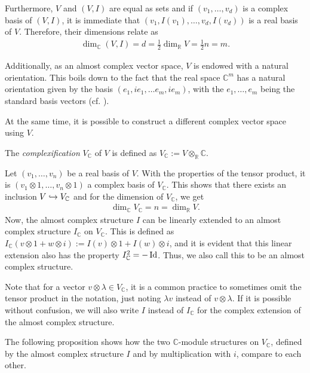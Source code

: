 Furthermore, $V$ and $(V,I)$ are equal as sets and if $(v_1,\dots,v_d)$ is a complex basis of
$(V,I)$, it is immediate that $(v_1,I(v_1),\dots,v_d,I(v_d))$ is a real basis of $V$. Therefore,
their dimensions relate as
\begin{align*}
	\dim_\mathbb{C} (V,I) = d = \frac{1}{2} \dim_\mathbb{R} V = \frac{1}{2}n = m.
\end{align*}

Additionally, as an almost complex vector space, $V$ is endowed with a natural orientation. This
boils down to the fact that the real space $\mathbb{C}^m$ has a natural orientation given by the
basis $(e_1, ie_1, \dots e_m, ie_m)$, with the $e_1,\dots,e_m$ being the standard basis vectors (cf.
\cite[Corollary 1.2.3]{Huybrechts2004}).

At the same time, it is possible to construct a different complex vector space using $V$. 
\begin{defn}
	The \emph{complexification} $V_\mathbb{C}$ of $V$ is defined as
	$V_\mathbb{C} := V \otimes_\mathbb{R} \mathbb{C}$.
\end{defn}
Let $\left(v_1, \dots, v_n\right)$ be a real basis of $V$. With the properties of the tensor
product, it is $\left(v_1 \otimes 1, \dots , v_n \otimes 1\right)$ a complex basis of
$V_\mathbb{C}$. This shows that there exists an inclusion $V \hookrightarrow V_\mathbb{C}$ and for the
dimension of $V_\mathbb{C}$, we get
\begin{align*}
	\dim_\mathbb{C} V_\mathbb{C} = n = \dim_\mathbb{R} V.
\end{align*}
Now, the almost complex structure $I$ can be linearly extended to an almost complex structure
$I_\mathbb{C}$ on $V_\mathbb{C}$. This is defined as $I_\mathbb{C} (v\otimes 1 + w \otimes i) :=
I(v) \otimes 1 + I(w)\otimes i$, and it is evident that this linear extension also has the property
$I_\mathbb{C}^2 = -\operatorname{Id}$. Thus, we also call this to be an almost complex structure.
\begin{nota}
	Note that for a vector $v\otimes \lambda \in V_\mathbb{C}$, it is a common practice to sometimes
	omit the tensor product in the notation, just noting $\lambda v$ instead of $v \otimes \lambda$. If
	it is possible without confusion, we will also write $I$ instead of $I_\mathbb{C}$ for the complex
	extension of the almost complex structure.
\end{nota}
The following proposition shows how the two $\mathbb{C}$-module structures on $V_\mathbb{C}$,
defined by the almost complex structure $I$ and by multiplication with $i$, compare to each other.
